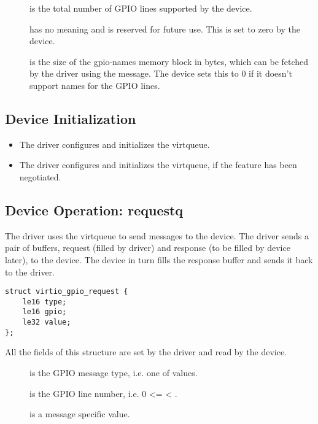\begin{description}
\item[] is the total number of GPIO lines supported by the device.

\item[] has no meaning and is reserved for future use. This is
    set to zero by the device.

\item[] is the size of the gpio-names memory block in
    bytes, which can be fetched by the driver using the
     message. The device sets this to
    0 if it doesn't support names for the GPIO lines.
\end{description}


\subsection{Device Initialization}\label{sec:Device Types / GPIO Device / Device Initialization}

\begin{itemize}
\item The driver configures and initializes the  virtqueue.

\item The driver configures and initializes the  virtqueue, if the
     feature has been negotiated.
\end{itemize}

\subsection{Device Operation: requestq}\label{sec:Device Types / GPIO Device / requestq Operation}

The driver uses the  virtqueue to send messages to the device.
The driver sends a pair of buffers, request (filled by driver) and response (to
be filled by device later), to the device. The device in turn fills the response
buffer and sends it back to the driver.

\begin{lstlisting}
struct virtio_gpio_request {
    le16 type;
    le16 gpio;
    le32 value;
};
\end{lstlisting}

All the fields of this structure are set by the driver and read by the device.

\begin{description}
\item[] is the GPIO message type, i.e. one of
     values.

\item[] is the GPIO line number, i.e. 0 <=  <
    .

\item[] is a message specific value.
\end{description}

